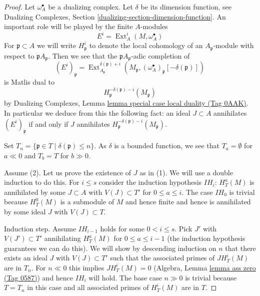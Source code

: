 \documentclass{amsart}
\theoremstyle{plain}
\theoremstyle{definition}
\theoremstyle{remark}
\numberwithin{equation}{subsection}
\def\Ext{\mathop{\mathrm{Ext}}\nolimits}
\begin{document}
\begin{proof}
Let $\omega_A^\bullet$ be a dualizing complex. Let $\delta$ be its
dimension function, see Dualizing Complexes, Section
\ref{dualizing-section-dimension-function}.
An important role will be played by the finite $A$-modules
$$
E^i = \Ext_A^i(M, \omega_A^\bullet)
$$
For $\mathfrak p \subset A$ we will write $H^i_\mathfrak p$ to denote the
local cohomology of an $A_\mathfrak p$-module with respect to
$\mathfrak pA_\mathfrak p$. Then we see that
the $\mathfrak pA_\mathfrak p$-adic completion of
$$
(E^i)_\mathfrak p =
\Ext^{\delta(\mathfrak p) + i}_{A_\mathfrak p}(M_\mathfrak p,
(\omega_A^\bullet)_\mathfrak p[-\delta(\mathfrak p)])
$$
is Matlis dual to
$$
H^{-\delta(\mathfrak p) - i}_{\mathfrak p}(M_\mathfrak p)
$$
by
Dualizing Complexes, Lemma \href{https://stacks.math.columbia.edu/tag/0AAK}{lemma special case local duality (Tag 0AAK)}.
In particular we deduce from this the
following fact: an ideal $J \subset A$ annihilates
$(E^i)_\mathfrak p$ if and only if $J$ annihilates
$H^{-\delta(\mathfrak p) - i}_{\mathfrak p}(M_\mathfrak p)$.

\medskip\noindent
Set $T_n = \{\mathfrak p \in T \mid \delta(\mathfrak p) \leq n\}$.
As $\delta$ is a bounded function, we see that
$T_a = \emptyset$ for $a \ll 0$ and $T_b = T$ for $b \gg 0$.

\medskip\noindent
Assume (2). Let us prove the existence of $J$ as in (1).
We will use a double induction to do this. For $i \leq s$
consider the induction hypothesis $IH_i$:
$H^a_T(M)$ is annihilated by some $J \subset A$ with $V(J) \subset T'$
for $0 \leq a \leq i$. The case $IH_0$ is trivial
because $H^0_T(M)$ is a submodule of $M$ and hence finite
and hence is annihilated by some ideal $J$ with $V(J) \subset T$.

\medskip\noindent
Induction step. Assume $IH_{i - 1}$ holds for some $0 < i \leq s$.
Pick $J'$ with $V(J') \subset T'$ annihilating $H^a_T(M)$ for
$0 \leq a \leq i - 1$ (the induction hypothesis guarantees we can
do this). We will show by descending induction on $n$
that there exists an ideal $J$ with $V(J) \subset T'$ such that the
associated primes of $J H^i_T(M)$ are in $T_n$.
For $n \ll 0$ this implies $JH^i_T(M) = 0$ 
(Algebra, Lemma \href{https://stacks.math.columbia.edu/tag/0587}{lemma ass zero (Tag 0587)})
and hence $IH_i$ will hold.
The base case $n \gg 0$ is trivial because $T = T_n$ in this case
and all associated primes of $H^i_T(M)$ are in $T$.


\end{proof}
\end{document}

